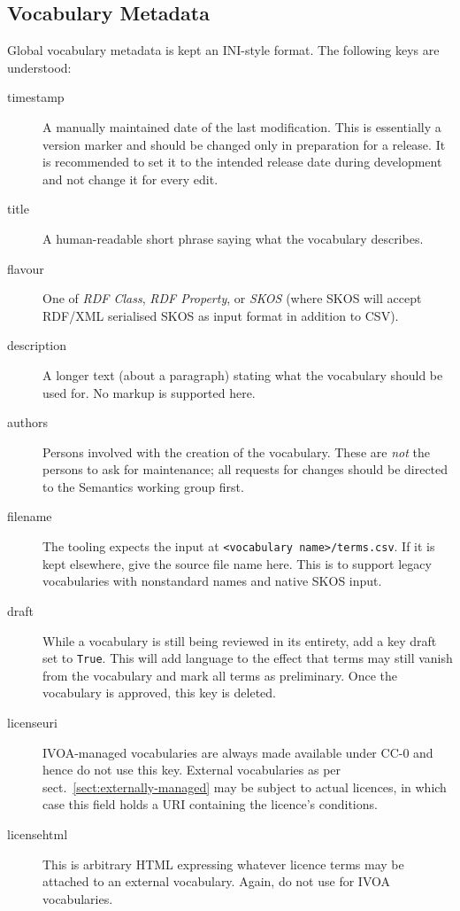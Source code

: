 \documentclass[11pt,a4paper]{ivoa}
\def\vocterm#1{\emph{\color{termcolor}#1}}
\def\vocterm{\startvocterm\realvocterm}
\def\realvocterm#1{\emph{\color{termcolor}#1}\endvocterm}
\gdef\breakablecolon{:\hskip0pt}
\gdef\startvocterm{\begingroup
  \catcode`\:=\active\let:=\breakablecolon}
\gdef\endvocterm{\endgroup}
\begin{document}

\subsection{Vocabulary Metadata}
\label{sect:vocmeta}

Global vocabulary metadata is kept an INI-style format.  The following
keys are understood:

\begin{description}
\item[timestamp]
  A manually maintained date of the last modification.  This is
  essentially a version marker and should be changed only in preparation
  for a release.  It is recommended to set it to the intended release
  date during development and not change it for every edit.
\item[title]
  A human-readable short phrase saying what the vocabulary describes.
\item[flavour]
  One of \textit{RDF Class}, \textit{RDF Property}, or \textit{SKOS}
  (where SKOS will accept RDF/XML serialised SKOS as input format in
  addition to CSV).
\item[description]
  A longer text (about a paragraph) stating what the vocabulary should
  be used for.  No markup is supported here.
\item[authors]
  Persons involved with the creation of the vocabulary.  These are \emph{not}
  the persons to ask for maintenance; all requests for changes should be
  directed to the Semantics working group first.
\item[filename]
  The tooling expects the input at
  \verb|<vocabulary name>/terms.csv|.  If it is kept elsewhere, give
  the source file name here.  This is to support legacy
  vocabularies with nonstandard names and native SKOS input.
\item[draft]
  While a vocabulary is still being reviewed in its entirety, add a key
  draft set to \texttt{True}.  This will add language to the effect that
  terms may still vanish from the vocabulary and mark all terms as
  preliminary.  Once the vocabulary is approved, this key is deleted.
\item[licenseuri]
  IVOA-managed vocabularies are always made available under CC-0 and
  hence do not use this key.  External vocabularies as per
  sect.~\ref{sect:externally-managed} may be subject to actual licences,
  in which case this field holds a URI containing the licence's
  conditions.
\item[licensehtml]
  This is arbitrary HTML expressing whatever licence terms may be
  attached to an external vocabulary.  Again, do not use for IVOA
  vocabularies.
\end{description}
\end{document}
